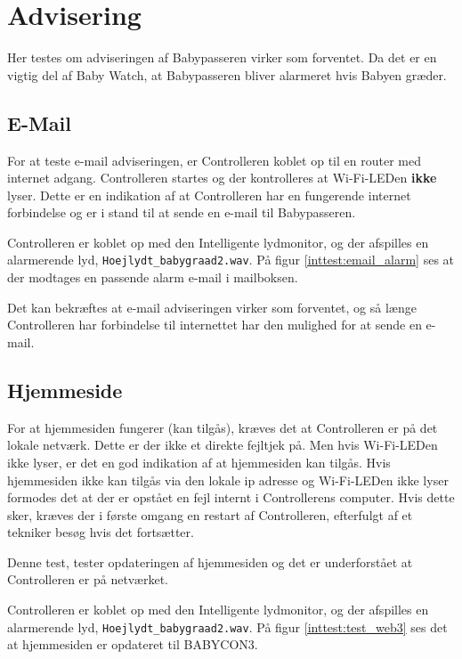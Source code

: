 \newpage
\section{Advisering}

Her testes om adviseringen af Babypasseren virker som forventet. Da det er en vigtig del af Baby Watch, at Babypasseren bliver alarmeret hvis Babyen græder.

\subsection*{E-Mail}

For at teste e-mail adviseringen, er Controlleren koblet op til en router med internet adgang. Controlleren startes og der kontrolleres at Wi-Fi-LEDen \textbf{ikke} lyser. Dette er en indikation af at Controlleren har en fungerende internet forbindelse og er i stand til at sende en e-mail til Babypasseren.

Controlleren er koblet op med den Intelligente lydmonitor, og der afspilles en alarmerende lyd, \verb+Hoejlydt_babygraad2.wav+. På figur \ref{inttest:email_alarm} ses at der modtages en passende alarm e-mail i mailboksen.


Det kan bekræftes at e-mail adviseringen virker som forventet, og så længe Controlleren har forbindelse til internettet har den mulighed for at sende en e-mail.

\newpage
\subsection*{Hjemmeside}

For at hjemmesiden fungerer (kan tilgås), kræves det at Controlleren er på det lokale netværk. Dette er der ikke et direkte fejltjek på. Men hvis Wi-Fi-LEDen ikke lyser, er det en god indikation af at hjemmesiden kan tilgås. Hvis hjemmesiden ikke kan tilgås via den lokale ip adresse og Wi-Fi-LEDen ikke lyser formodes det at der er opstået en fejl internt i Controllerens computer. Hvis dette sker, kræves der i første omgang en restart af Controlleren, efterfulgt af et tekniker besøg hvis det fortsætter. 

Denne test, tester opdateringen af hjemmesiden og det er underforstået at Controlleren er på netværket.

Controlleren er koblet op med den Intelligente lydmonitor, og der afspilles en alarmerende lyd, \verb+Hoejlydt_babygraad2.wav+. På figur \ref{inttest:test_web3} ses det at hjemmesiden er opdateret til BABYCON3.


